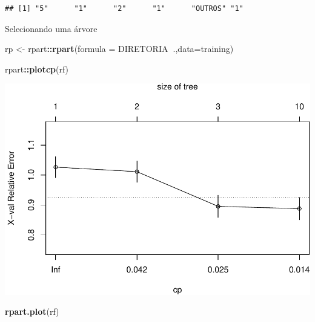 \documentclass[]{article}
\newenvironment{Shaded}{\begin{snugshade}}{\end{snugshade}}
\newcommand{\DataTypeTok}[1]{\textcolor[rgb]{0.13,0.29,0.53}{#1}}
\newcommand{\KeywordTok}[1]{\textcolor[rgb]{0.13,0.29,0.53}{\textbf{#1}}}
\newcommand{\NormalTok}[1]{#1}
\newcommand{\OperatorTok}[1]{\textcolor[rgb]{0.81,0.36,0.00}{\textbf{#1}}}
\newcommand{\StringTok}[1]{\textcolor[rgb]{0.31,0.60,0.02}{#1}}
\begin{document}
\begin{verbatim}
## [1] "5"      "1"      "2"      "1"      "OUTROS" "1"
\end{verbatim}

Selecionando uma árvore

\begin{Shaded}
\begin{Highlighting}[]
\NormalTok{rp <-}\StringTok{ }\NormalTok{rpart}\OperatorTok{::}\KeywordTok{rpart}\NormalTok{(}\DataTypeTok{formula =}\NormalTok{ DIRETORIA}\OperatorTok{~}\NormalTok{.,}\DataTypeTok{data=}\NormalTok{training)}
\end{Highlighting}
\end{Shaded}

\begin{Shaded}
\begin{Highlighting}[]
\NormalTok{rpart}\OperatorTok{::}\KeywordTok{plotcp}\NormalTok{(rf)}
\end{Highlighting}
\end{Shaded}

\includegraphics{markdown_v50_files/figure-latex/unnamed-chunk-89-1.pdf}

\begin{Shaded}
\begin{Highlighting}[]
\KeywordTok{rpart.plot}\NormalTok{(rf)}
\end{Highlighting}
\end{Shaded}
\end{document}
